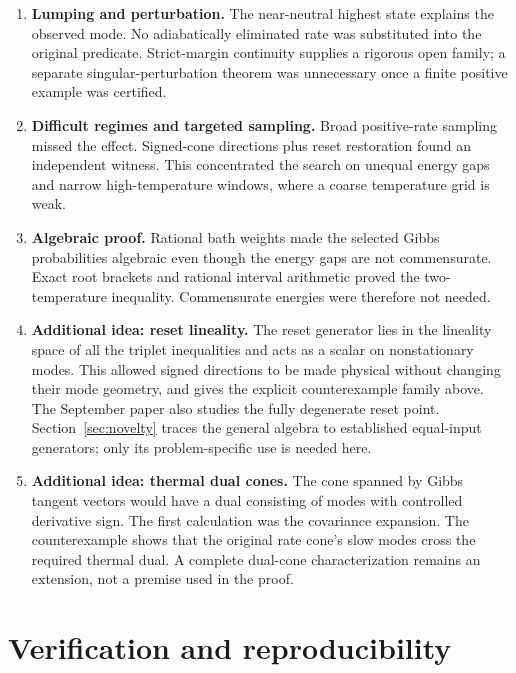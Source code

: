 \documentclass[11pt]{article}
\begin{document}
\begin{enumerate}
\item \textbf{Lumping and perturbation.} The near-neutral highest state explains the observed mode. No adiabatically eliminated rate was substituted into the original predicate. Strict-margin continuity supplies a rigorous open family; a separate singular-perturbation theorem was unnecessary once a finite positive example was certified.
\item \textbf{Difficult regimes and targeted sampling.} Broad positive-rate sampling missed the effect. Signed-cone directions plus reset restoration found an independent witness. This concentrated the search on unequal energy gaps and narrow high-temperature windows, where a coarse temperature grid is weak.
\item \textbf{Algebraic proof.} Rational bath weights made the selected Gibbs probabilities algebraic even though the energy gaps are not commensurate. Exact root brackets and rational interval arithmetic proved the two-temperature inequality. Commensurate energies were therefore not needed.
\item \textbf{Additional idea: reset lineality.} The reset generator lies in the lineality space of all the triplet inequalities and acts as a scalar on nonstationary modes. This allowed signed directions to be made physical without changing their mode geometry, and gives the explicit counterexample family above. The September paper also studies the fully degenerate reset point. Section~\ref{sec:novelty} traces the general algebra to established equal-input generators; only its problem-specific use is needed here.
\item \textbf{Additional idea: thermal dual cones.} The cone spanned by Gibbs tangent vectors would have a dual consisting of modes with controlled derivative sign. The first calculation was the covariance expansion. The counterexample shows that the original rate cone's slow modes cross the required thermal dual. A complete dual-cone characterization remains an extension, not a premise used in the proof.
\end{enumerate}

\section{Verification and reproducibility}
\end{document}
